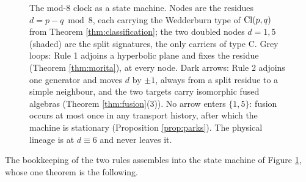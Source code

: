\begin{figure}[t]
\centering
{}
\caption{The mod-8 clock as a state machine. Nodes are the residues $d = p - q \bmod 8$, each carrying the Wedderburn type of $\mathrm{Cl}(p,q)$ from Theorem \ref{thm:classification}; the two doubled nodes $d = 1, 5$ (shaded) are the split signatures, the only carriers of type C. Grey loops: Rule 1 adjoins a hyperbolic plane and fixes the residue (Theorem \ref{thm:morita}), at every node. Dark arrows: Rule 2 adjoins one generator and moves $d$ by $\pm 1$, always from a split residue to a simple neighbour, and the two targets carry isomorphic fused algebras (Theorem \ref{thm:fusion}(3)). No arrow enters $\{1, 5\}$: fusion occurs at most once in any transport history, after which the machine is stationary (Proposition \ref{prop:parks}). The physical lineage is at $d \equiv 6$ and never leaves it.}
\label{fig:clock}
\end{figure}

The bookkeeping of the two rules assembles into the state machine of Figure \ref{fig:clock}, whose one theorem is the following.

